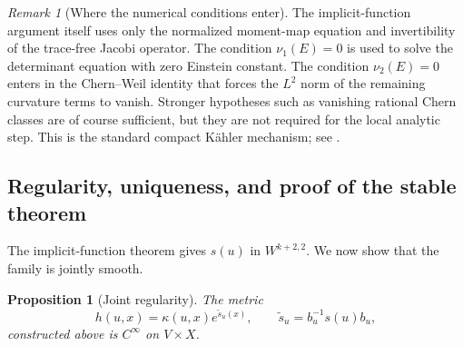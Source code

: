 \documentclass[11pt,reqno]{amsart}
\newtheorem{proposition}[theorem]{Proposition}
\theoremstyle{definition}
\theoremstyle{remark}
\newtheorem{remark}[theorem]{Remark}
\begin{document}
\begin{remark}[Where the numerical conditions enter]
The implicit-function argument itself uses only the normalized moment-map equation and invertibility of the trace-free Jacobi operator.  The condition $\nu_1(E)=0$ is used to solve the determinant equation with zero Einstein constant.  The condition $\nu_2(E)=0$ enters in the Chern--Weil identity that forces the $L^2$ norm of the remaining curvature terms to vanish.  Stronger hypotheses such as vanishing rational Chern classes are of course sufficient, but they are not required for the local analytic step.  This is the standard compact K\"ahler mechanism; see \cite{Simpson1988,Simpson1992}.
\end{remark}

\subsection{Regularity, uniqueness, and proof of the stable theorem}

The implicit-function theorem gives $s(u)$ in $W^{k+2,2}$.  We now show that the family is jointly smooth.

\begin{proposition}[Joint regularity]\label{prop:joint-regularity}
The metric
\[
  h(u,x)=\kappa(u,x)e^{\widetilde s_u(x)},
  \qquad
  \widetilde s_u=b_u^{-1}s(u)b_u,
\]
constructed above is $C^\infty$ on $V\times X$.
\end{proposition}
\end{document}
